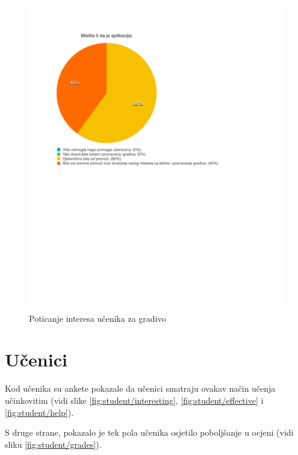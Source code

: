 \documentclass[11pt]{scrreprt}
\begin{document}
\begin{figure}[H]
  \includegraphics[width=\textwidth, clip=true, trim=0 2.5cm 0 0]{school/help}
  \caption{Poticanje interesa učenika za gradivo}
  \label{fig:school/help}
\end{figure}

\section{Učenici}

Kod učenika su ankete pokazale da učenici smatraju ovakav način učenja
učinkovitim (vidi slike \ref{fig:student/interesting},
\ref{fig:student/effective} i \ref{fig:student/help}).

S druge strane, pokazalo je tek pola učenika osjetilo poboljšanje u ocjeni
(vidi sliku \ref{fig:student/grades}).
\end{document}
